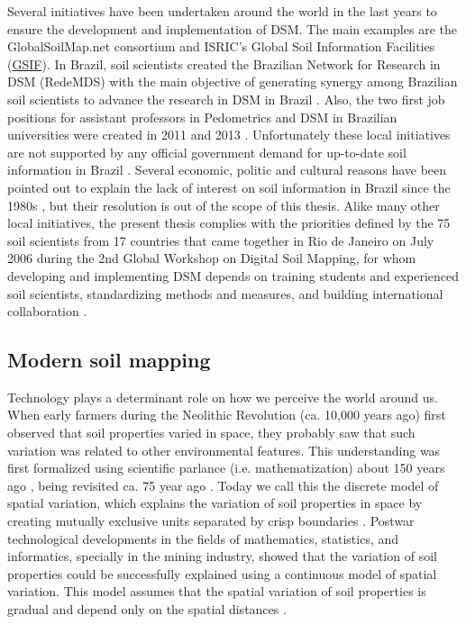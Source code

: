 Several initiatives have been undertaken around the world in the last years to 
ensure the development and implementation of DSM. The main examples are the 
GlobalSoilMap.net consortium and ISRIC's Global Soil Information Facilities
(\href{http://www.isric.org/projects/global-soil-information-facilities-gsif}{GSIF}).
In Brazil, soil scientists created the Brazilian Network for Research in DSM 
(RedeMDS) with the main objective of generating synergy among Brazilian soil 
scientists to advance the research in DSM in Brazil \cite{RedeMDS2013}. Also, 
the two first job positions for assistant professors in Pedometrics and DSM in 
Brazilian universities were created in 2011 and 2013 \cite{UFRRJ2011,UFSM2012}. 
Unfortunately these local initiatives are not supported by any official 
government demand for up-to-date soil information in Brazil 
\cite{SamuelRosa2012}. Several economic, politic and cultural reasons have been 
pointed out to explain the lack of interest on soil information in Brazil since 
the 1980s \cite{Dalmolin1999, Ker1999, KerEtAl2003, Ramos2003, Espindola2008}, 
but their resolution is out of the scope of this thesis. Alike many other local
initiatives, the present thesis complies with the priorities defined by the 75 
soil scientists from 17 countries that came together in Rio de Janeiro on July 
2006 during the 2nd Global Workshop on Digital Soil Mapping, for whom developing
and implementing DSM depends on training students and experienced soil 
scientists, standardizing methods and measures, and building international 
collaboration \cite{Boettinger2004}.

\subsection{Modern soil mapping}

Technology plays a determinant role on how we perceive the world around us. When early farmers during the Neolithic Revolution (ca. 10,000 years ago) first observed that soil properties varied in space, they probably saw that such variation was related to other environmental features. This understanding was first formalized using scientific parlance (i.e. mathematization) about 150 years ago \cite{Florinsky2012}, being revisited ca. 75 year ago \cite{Jenny1941}. Today we call this the discrete model of spatial variation, which explains the variation of soil properties in space by creating mutually exclusive units separated by crisp boundaries \cite{Legros2006}. Postwar technological developments in the fields of mathematics, statistics, and informatics, specially in the mining industry, showed that the variation of soil properties could be successfully explained using a continuous model of spatial variation. This model assumes that the spatial variation of soil properties is gradual and depend only on the spatial distances \cite{WebsterEtAl1990}.

